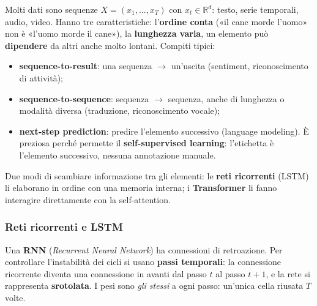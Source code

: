\documentclass[12pt]{extarticle}
\begin{document}
\noindent Molti dati sono sequenze $X=(x_1,\dots,x_T)$ con $x_t\in\mathbb{R}^d$: testo, serie temporali, audio, video. Hanno tre caratteristiche: l'\textbf{ordine conta} («il cane morde l'uomo» non è «l'uomo morde il cane»), la \textbf{lunghezza varia}, un elemento può \textbf{dipendere} da altri anche molto lontani. Compiti tipici:
\begin{itemize}
    \item \textbf{sequence-to-result}: una sequenza $\to$ un'uscita (sentiment, riconoscimento di attività);
    \item \textbf{sequence-to-sequence}: sequenza $\to$ sequenza, anche di lunghezza o modalità diversa (traduzione, riconoscimento vocale);
    \item \textbf{next-step prediction}: predire l'elemento successivo (language modeling). È preziosa perché permette il \textbf{self-supervised learning}: l'etichetta è l'elemento successivo, nessuna annotazione manuale.
\end{itemize}
Due modi di scambiare informazione tra gli elementi: le \textbf{reti ricorrenti} (LSTM) li elaborano in ordine con una memoria interna; i \textbf{Transformer} li fanno interagire direttamente con la self-attention.

\subsubsection{Reti ricorrenti e LSTM}

\noindent Una \textbf{RNN} (\emph{Recurrent Neural Network}) ha connessioni di retroazione. Per controllare l'instabilità dei cicli si usano \textbf{passi temporali}: la connessione ricorrente diventa una connessione in avanti dal passo $t$ al passo $t+1$, e la rete si rappresenta \textbf{srotolata}. I pesi sono \emph{gli stessi} a ogni passo: un'unica cella riusata $T$ volte.

\begin{center}
\end{center}
\end{document}
